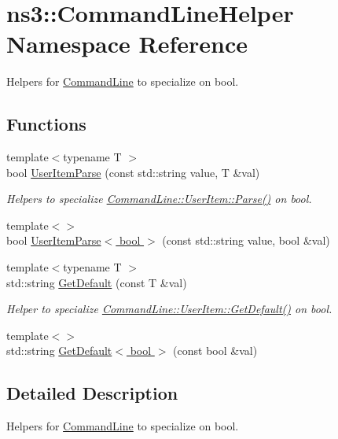 \hypertarget{namespacens3_1_1CommandLineHelper}{}\section{ns3\+:\+:Command\+Line\+Helper Namespace Reference}
\label{namespacens3_1_1CommandLineHelper}


Helpers for \hyperlink{classns3_1_1CommandLine}{Command\+Line} to specialize on bool.  


\subsection*{Functions}
{\bf }\par
\begin{DoxyCompactItemize}
\item 
{\footnotesize template$<$typename T $>$ }\\bool \hyperlink{group__commandlinehelper_ga284d64fb24301f2cfdec01edbba8a6da}{User\+Item\+Parse} (const std\+::string value, T \&val)
\begin{DoxyCompactList}\small\item\em Helpers to specialize \hyperlink{classns3_1_1CommandLine_1_1UserItem_a1e35f03bcc7eea7343fcef8beec53dbb}{Command\+Line\+::\+User\+Item\+::\+Parse()} on bool. \end{DoxyCompactList}\item 
{\footnotesize template$<$$>$ }\\bool \hyperlink{group__commandlinehelper_gaab7ae136fb6933489d59fb29a9b52438}{User\+Item\+Parse$<$ bool $>$} (const std\+::string value, bool \&val)
\end{DoxyCompactItemize}

{\bf }\par
\begin{DoxyCompactItemize}
\item 
{\footnotesize template$<$typename T $>$ }\\std\+::string \hyperlink{group__commandlinehelper_ga9a8370d21f9b801cd8c631f66f0d5c39}{Get\+Default} (const T \&val)
\begin{DoxyCompactList}\small\item\em Helper to specialize \hyperlink{classns3_1_1CommandLine_1_1UserItem_a8beb0fdb64ff17d1e4717e3b4c50c573}{Command\+Line\+::\+User\+Item\+::\+Get\+Default()} on bool. \end{DoxyCompactList}\item 
{\footnotesize template$<$$>$ }\\std\+::string \hyperlink{group__commandlinehelper_gaa9a9ae90ef630d3cbfda231dcc708d3c}{Get\+Default$<$ bool $>$} (const bool \&val)
\end{DoxyCompactItemize}



\subsection{Detailed Description}
Helpers for \hyperlink{classns3_1_1CommandLine}{Command\+Line} to specialize on bool. 